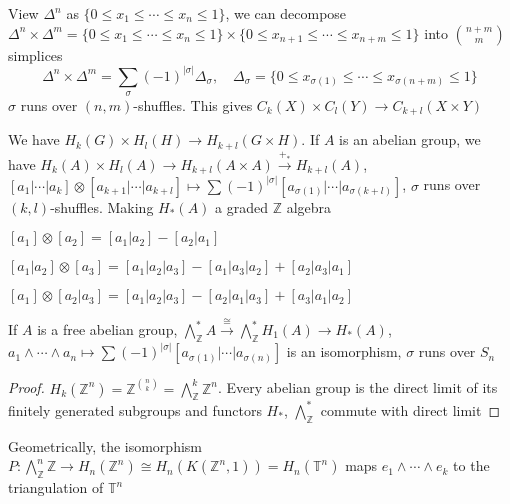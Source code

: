 \documentclass[../main.tex]{subfiles}
\begin{document}
\begin{definition}
View $\Delta^n$ as $\{0\leq x_1\leq\cdots\leq x_n\leq1\}$, we can decompose $\Delta^n\times\Delta^m=\{0\leq x_1\leq\cdots\leq x_n\leq1\}\times\{0\leq x_{n+1}\leq\cdots\leq x_{n+m}\leq1\}$ into $\binom{n+m}{m}$ simplices
\[\Delta^n\times\Delta^m=\sum_{\sigma}(-1)^{|\sigma|}\Delta_{\sigma},\quad \Delta_\sigma=\{0\leq x_{\sigma(1)}\leq\cdots\leq x_{\sigma(n+m)}\leq1\}\]
$\sigma$ runs over $(n,m)$-shuffles. This gives $C_k(X)\times C_l(Y)\to C_{k+l}(X\times Y)$
\end{definition}

\begin{definition}
We have $H_k(G)\times H_l(H)\to H_{k+l}(G\times H)$. If $A$ is an abelian group, we have $H_k(A)\times H_l(A)\to H_{k+l}(A\times A)\xrightarrow{+_*}H_{k+l}(A)$, $[a_1|\cdots|a_k]\otimes[a_{k+1}|\cdots|a_{k+l}]\mapsto\sum(-1)^{|\sigma|}[a_{\sigma(1)}|\cdots|a_{\sigma(k+l)}]$, $\sigma$ runs over $(k,l)$-shuffles. Making $H_*(A)$ a graded $\mathbb Z$ algebra
\end{definition}

\begin{example}
$[a_1]\otimes[a_2]=[a_1|a_2]-[a_2|a_1]$ \par
$[a_1|a_2]\otimes[a_3]=[a_1|a_2|a_3]-[a_1|a_3|a_2]+[a_2|a_3|a_1]$ \par
$[a_1]\otimes[a_2|a_3]=[a_1|a_2|a_3]-[a_2|a_1|a_3]+[a_3|a_1|a_2]$
\end{example}

\begin{theorem}
If $A$ is a free abelian group, $\bigwedge^*_{\mathbb Z}A\xrightarrow{\cong}\bigwedge^*_{\mathbb Z}H_1(A)\to H_*(A)$, $a_1\wedge\cdots\wedge a_n\mapsto\sum(-1)^{|\sigma|}[a_{\sigma(1)}|\cdots|a_{\sigma(n)}]$ is an isomorphism, $\sigma$ runs over $S_n$
\end{theorem}

\begin{proof}
$H_k(\mathbb Z^n)=\mathbb Z^{\binom{n}{k}}=\bigwedge^k_{\mathbb Z}\mathbb Z^n$. Every abelian group is the direct limit of its finitely generated subgroups and functors $H_*$, $\bigwedge_{\mathbb Z}^*$ commute with direct limit
\end{proof}

\begin{example}
Geometrically, the isomorphism $P:\bigwedge^n_{\mathbb Z}\mathbb Z\to H_n(\mathbb Z^n)\cong H_n(K(\mathbb Z^n,1))=H_n(\mathbb T^n)$ maps $e_1\wedge\cdots\wedge e_k$ to the triangulation of $\mathbb T^n$
\end{example}
\end{document}
